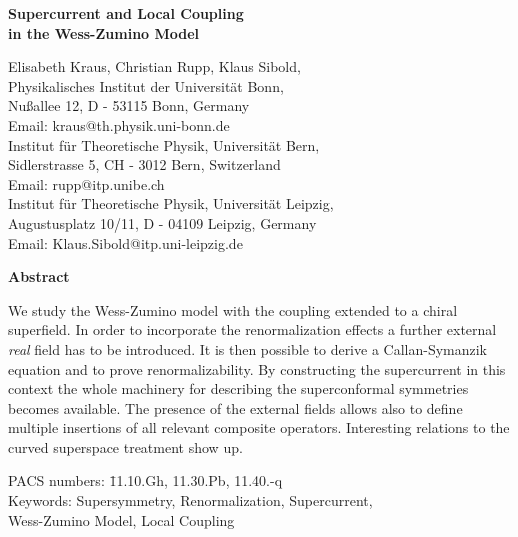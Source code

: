 \documentclass[a4paper,12pt]{article}
\begin{document}
\thispagestyle{empty}

\vspace*{0.1cm}
\begin{center}
{\LARGE \bf Supercurrent and Local Coupling\\[2mm] in the Wess-Zumino
  Model}

\vspace{1cm}

Elisabeth Kraus\coordHE{},
Christian Rupp\coordHE{}, 
Klaus Sibold\coordHE{},
\\[0.7cm]
\coordHE{} Physikalisches Institut der Universit\"at Bonn,\\
Nu\ss allee 12, D - 53115 Bonn, Germany\\
Email: kraus@th.physik.uni-bonn.de
\\[5mm]
\coordHE{} Institut f{\"u}r Theoretische Physik, Universit{\"a}t Bern,\\
Sidlerstrasse 5, CH - 3012 Bern, Switzerland\\
Email: rupp@itp.unibe.ch
\\[5mm]
\coordHE{} Institut f{\"u}r Theoretische Physik, Universit{\"a}t Leipzig,\\
Augustusplatz 10/11, D - 04109 Leipzig, Germany\\
Email: Klaus.Sibold@itp.uni-leipzig.de\\ 


\end{center}

\vspace{0.5cm}


\begin{center}
\parbox{12cm}{
\centerline{\small \bf Abstract}
\small \noindent 
We study the Wess-Zumino model with the coupling extended to a chiral
superfield. In order to incorporate the renormalization effects a
further external {\sl real} field  has to be introduced. It is then
possible to derive a Callan-Symanzik equation and to prove renormalizability.
By constructing the supercurrent in this context the whole machinery
for describing the superconformal symmetries becomes available.
The presence of the external fields allows also to define multiple
insertions of all relevant composite operators. Interesting relations
to the curved superspace treatment show up.
}
\end{center}

\vspace*{10mm}
\begin{tabbing}
PACS numbers: \= 11.10.Gh, 11.30.Pb, 11.40.-q\\ 
Keywords:\>
Supersymmetry, Renormalization, 
Supercurrent,\\ \> Wess-Zumino Model, Local Coupling
\end{tabbing}
\newpage
\end{document}

